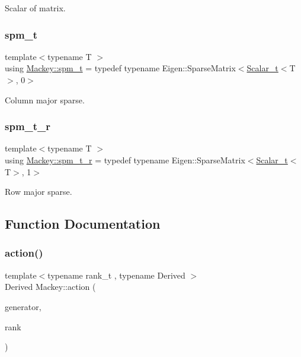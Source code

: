 Scalar of matrix. 

\mbox{\label{namespaceMackey_a6fae5aa6894681eabd63f02c387ac618}} 
\subsubsection{\texorpdfstring{spm\+\_\+t}{spm\_t}}
{\footnotesize\ttfamily template$<$typename T $>$ \\
using \hyperlink{namespaceMackey_a6fae5aa6894681eabd63f02c387ac618}{Mackey\+::spm\+\_\+t} = typedef typename Eigen\+::\+Sparse\+Matrix$<$\hyperlink{namespaceMackey_a93ba297573961f91101fb84bc84bbe95}{Scalar\+\_\+t}$<$T$>$, 0$>$}



Column major sparse. 

\mbox{\label{namespaceMackey_a43f350029dd91403df428883f202a7b6}} 
\subsubsection{\texorpdfstring{spm\+\_\+t\+\_\+r}{spm\_t\_r}}
{\footnotesize\ttfamily template$<$typename T $>$ \\
using \hyperlink{namespaceMackey_a43f350029dd91403df428883f202a7b6}{Mackey\+::spm\+\_\+t\+\_\+r} = typedef typename Eigen\+::\+Sparse\+Matrix$<$\hyperlink{namespaceMackey_a93ba297573961f91101fb84bc84bbe95}{Scalar\+\_\+t}$<$T$>$, 1$>$}



Row major sparse. 



\subsection{Function Documentation}
\mbox{\label{namespaceMackey_aa515b26c0fbc7f19b36cee7d826f07b9}} 
\subsubsection{\texorpdfstring{action()}{action()}\hspace{0.1cm}{\footnotesize\ttfamily [1/2]}}
{\footnotesize\ttfamily template$<$typename rank\+\_\+t , typename Derived $>$ \\
Derived Mackey\+::action (\begin{DoxyParamCaption}\item[{const Eigen\+::\+Matrix\+Base$<$ Derived $>$ \&}]{generator,  }\item[{const rank\+\_\+t \&}]{rank }\end{DoxyParamCaption})}



